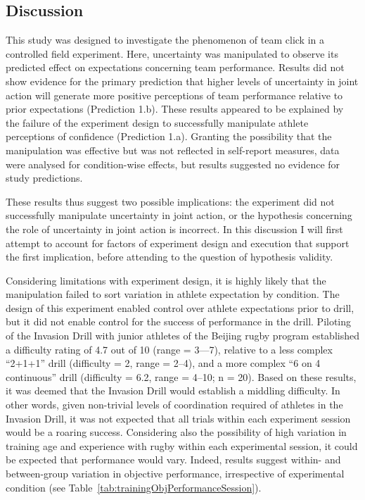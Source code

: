 \begin{CJK}{UTF8}{gbsn}
\section{Discussion\label{sect:discussionTrain}}
This study was designed to investigate the phenomenon of team click in a controlled field experiment. Here, uncertainty was manipulated to observe its predicted effect on expectations concerning team performance.  Results did not show evidence for the primary prediction that higher levels of uncertainty in joint action will generate more positive perceptions of team performance relative to prior expectations (Prediction 1.b).  These results appeared to be explained by the failure of the experiment design to successfully manipulate athlete perceptions of confidence (Prediction 1.a).  Granting the possibility that the manipulation was effective but was not reflected in self-report measures, data were analysed for condition-wise effects, but results suggested no evidence for study predictions.

These results thus suggest two possible implications: the experiment did not successfully manipulate uncertainty in joint action, or the hypothesis concerning the role of uncertainty in joint action is incorrect.  In this discussion I will first attempt to account for factors of experiment design and execution that support the first implication, before attending to the question of hypothesis validity.


Considering limitations with experiment design, it is highly likely that the manipulation failed to sort variation in athlete expectation by condition.  The design of this experiment enabled control over athlete expectations prior to drill, but it did not enable control for the success of performance in the drill.  Piloting of the Invasion Drill with junior athletes of the Beijing rugby program established a difficulty rating of 4.7 out of 10 (range = 3—7), relative to a less complex ``2+1+1'' drill (difficulty = 2, range = 2–4), and a more complex ``6 on 4 continuous'' drill (difficulty = 6.2, range = 4–10; n = 20).  Based on these results, it was deemed that the Invasion Drill would establish a middling difficulty.  In other words, given non-trivial levels of coordination required of athletes in the Invasion Drill, it was not expected that all trials within each experiment session would be a roaring success.  Considering also the possibility of high variation in training age and experience with rugby within each experimental session, it could be expected that performance would vary.  Indeed, results suggest within- and between-group variation in objective performance, irrespective of experimental condition (see Table~\ref{tab:trainingObjPerformanceSession}).


\end{CJK}
